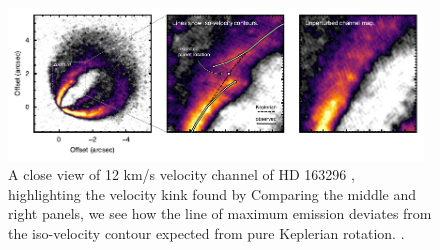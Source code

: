 \begin{figure}
    \centering
    \includegraphics[width = 0.98\textwidth]{figures/HD163296_channels.pdf}
    \caption{A close view of 12 km/s velocity channel of HD 163296 \citep{andrews2018}, highlighting the velocity kink found by \citet{pinte2018a} Comparing the middle and right panels, we see how the line of maximum emission deviates from the iso-velocity contour expected from pure Keplerian rotation. \citep{diskdynamicscollaboration2020}.}
    \label{fig:velocity_kink}
\end{figure}


